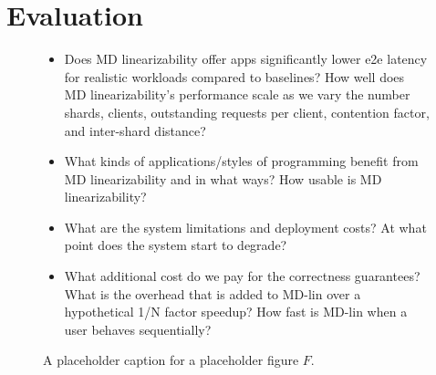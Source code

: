 \section{Evaluation}
\label{sec:eval}

\begin{figure}
  \centerline{}

\caption{A placeholder caption for a placeholder figure \boldmath$F$.}
  \begin{itemize}
    \item Does MD linearizability offer apps significantly lower e2e latency for realistic workloads compared to baselines?
      \subitem How well does MD linearizability’s performance scale as we vary the number shards, clients, outstanding requests per client, contention factor, and inter-shard distance?
    \item What kinds of applications/styles of programming benefit from MD linearizability and in what ways? How usable is MD linearizability?
    \item What are the system limitations and deployment costs? At what point does the system start to degrade?
    \item What additional cost do we pay for the correctness guarantees? What is the overhead that is added to MD-lin over a hypothetical 1/N factor speedup? How fast is MD-lin when a user behaves sequentially?

  \end{itemize}
\label{fig:placeholder}
\end{figure}
